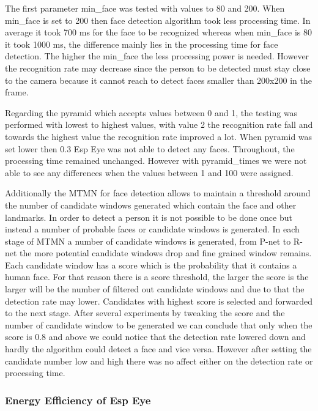 The first parameter {\selectfont min\_face} was tested with values to 80 and 200. When {\selectfont min\_face} is set to 200 then face detection algorithm took less processing time. In average it took 700 ms for the face to be recognized whereas when {\selectfont min\_face}  is 80 it took 1000 ms, the difference mainly lies in the processing time for face detection. The higher the {\selectfont min\_face} the less processing power is needed. However the recognition rate may decrease since the person to be detected must stay close to the camera because it cannot reach to detect faces smaller than 200x200 in the frame. 


Regarding the {\selectfont pyramid} which accepts values between 0 and 1, the testing was performed with lowest to highest values, with value 2 the recognition rate fall and towards the highest value the recognition rate improved a lot. When {\selectfont pyramid} was set lower then 0.3 Esp Eye was not able to detect any faces.  Throughout, the processing time remained unchanged. However with {\selectfont pyramid\_times} we were not able to see any differences when the values between 1 and 100 were assigned.  


Additionally the MTMN for face detection allows to maintain a threshold around the number of candidate windows generated which contain the face and other landmarks. In order to detect a person it is not possible to be done once but instead a number of probable faces or candidate windows is generated. In each stage of MTMN a number of candidate windows is generated, from P-net to R-net the more potential candidate windows drop and fine grained window remains. Each candidate window has a score which is the probability that it contains a human face. For that reason there is a score threshold, the larger the score is the larger will be the number of filtered out candidate windows and due to that the detection rate may lower. Candidates with highest score is selected and forwarded to the next stage. 
After several experiments by tweaking the score and the number of candidate window to be generated we can conclude that only when the score is  0.8 and above we could notice that the detection rate lowered down and hardly the algorithm could detect a face and vice versa. However after setting the candidate number low and high there was no affect either on the detection rate or processing time. 

\subsubsection{Energy Efficiency of Esp Eye}

